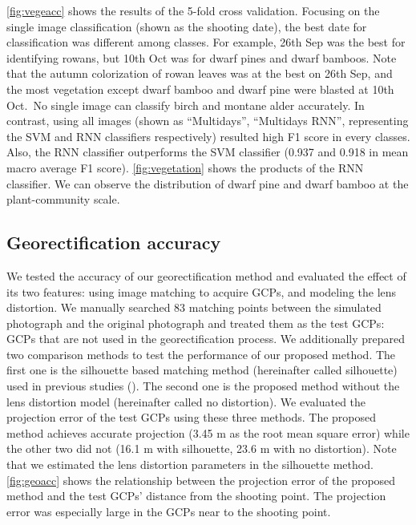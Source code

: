 \documentclass{article}
\begin{document}
\ref{fig:vegeacc} shows the results of the 5-fold cross validation. Focusing on the single image classification (shown as the shooting date), the best date for classification was different among classes. For example, 26th Sep was the best for identifying rowans, but 10th Oct was for dwarf pines and dwarf bamboos. Note that the autumn colorization of rowan leaves was at the best on 26th Sep, and the most vegetation except dwarf bamboo and dwarf pine were blasted at 10th Oct.~No single image can classify birch and montane alder accurately. In contrast, using all images (shown as ``Multidays'', ``Multidays RNN'', representing the SVM and RNN classifiers respectively) resulted high F1 score in every classes. Also, the RNN classifier outperforms the SVM classifier (0.937 and 0.918 in mean macro average F1 score). \ref{fig:vegetation} shows the products of the RNN classifier. We can observe the distribution of dwarf pine and dwarf bamboo at the plant-community scale.

\hypertarget{georectification-accuracy}{%
\subsection{Georectification accuracy}\label{georectification-accuracy}}

We tested the accuracy of our georectification method and evaluated the effect of its two features: using image matching to acquire GCPs, and modeling the lens distortion. We manually searched 83 matching points between the simulated photograph and the original photograph and treated them as the test GCPs: GCPs that are not used in the georectification process. We additionally prepared two comparison methods to test the performance of our proposed method. The first one is the silhouette based matching method (hereinafter called silhouette) used in previous studies (\cite{Portenier2020Cryosphere}). The second one is the proposed method without the lens distortion model (hereinafter called no distortion). We evaluated the projection error of the test GCPs using these three methods. The proposed method achieves accurate projection (3.45 m as the root mean square error) while the other two did not (16.1 m with silhouette, 23.6 m with no distortion). Note that we estimated the lens distortion parameters in the silhouette method. \ref{fig:geoacc} shows the relationship between the projection error of the proposed method and the test GCPs' distance from the shooting point. The projection error was especially large in the GCPs near to the shooting point.
\end{document}
